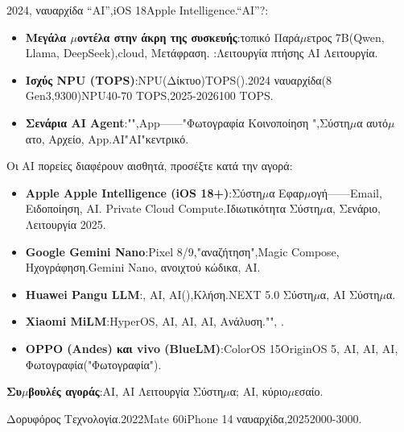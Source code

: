 


2024, ναυαρχίδα “AI”,iOS 18Apple Intelligence.“AI”?:

\begin{itemize}
  \item \textbf{Μεγάλα $\mu$οντέλα στην άκρη της συσκευής}:τοπικό Παρά$\mu$ετρος 7B(Qwen, Llama, DeepSeek),cloud, Μετάφραση. :Λειτουργία πτήσης AI Λειτουργία.
  \item \textbf{Ισχύς NPU (TOPS)}:NPU(Δίκτυο)TOPS().2024 ναυαρχίδα(8 Gen3,9300)NPU40-70 TOPS,2025-2026100 TOPS.
  \item \textbf{Σενάρια AI Agent}:"",App——"Φωτογραφία Κοινοποίηση ",Σύστη$\mu$α αυτό$\mu$ατο, Αρχείο, App.AI"AI"κεντρικό.
\end{itemize}


Οι AI πορείες διαφέρουν αισθητά, προσέξτε κατά την αγορά:

\begin{itemize}
  \item \textbf{Apple Apple Intelligence (iOS 18+)}:Σύστη$\mu$α Εφαρ$\mu$ογή——Email, Ειδοποίηση, AI. Private Cloud Compute.Ιδιωτικότητα Σύστη$\mu$α, Σενάριο, Λειτουργία 2025.
  \item \textbf{Google Gemini Nano}:Pixel 8/9,"αναζήτηση",Magic Compose, Ηχογράφηση.Gemini Nano, ανοιχτού κώδικα, AI.
  \item \textbf{Huawei Pangu LLM}:, AI, AI(),Κλήση.NEXT 5.0 Σύστη$\mu$α, AI Σύστη$\mu$α.
  \item \textbf{Xiaomi MiLM}:HyperOS, AI, AI, AI, Ανάλυση."", .
  \item \textbf{OPPO (Andes) και vivo (BlueLM)}:ColorOS 15OriginOS 5, AI, AI, AI, Φωτογραφία("Φωτογραφία").
\end{itemize}

\textbf{Συ$\mu$βουλές αγοράς}:AI, AI Λειτουργία Σύστη$\mu$α; AI, κύριο$\mu$εσαίο.


Δορυφόρος Τεχνολογία.2022Mate 60iPhone 14 ναυαρχίδα,20252000-3000.

